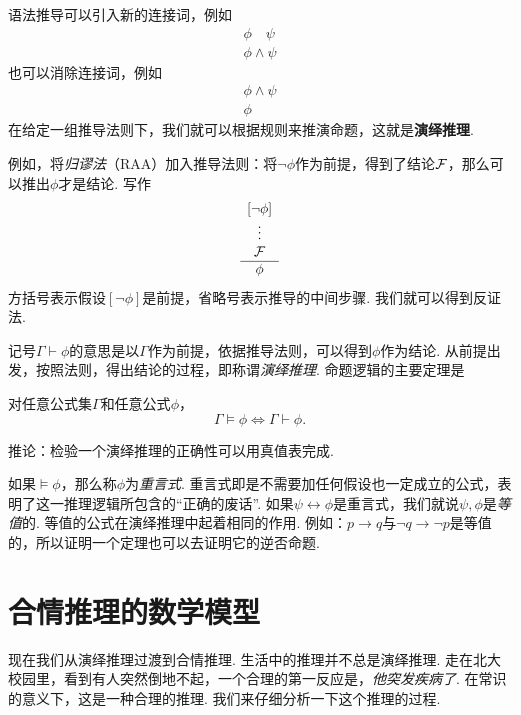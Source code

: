 语法推导可以引入新的连接词，例如
    \[\begin{array}{c}
         \phi\quad\psi  \\\hline
         \phi\wedge\psi
    \end{array}\]
也可以消除连接词，例如
    \[\begin{array}{c}
         \phi\wedge\psi  \\\hline
         \phi
    \end{array}\]
在给定一组推导法则下，我们就可以根据规则来推演命题，这就是\textbf{演绎推理}.

例如，将\emph{归谬法}（RAA）加入推导法则：将$\neg\phi$作为前提，得到了结论$\mathcal{F}$，那么可以推出$\phi$才是结论. 写作
    \[\begin{array}{c}
         [\neg\phi]  \\
         \vdots\\
         \mathcal{F}\\\hline
         \phi
    \end{array}\]
方括号表示假设$[\neg\phi]$是前提，省略号表示推导的中间步骤. 我们就可以得到反证法. 

记号$\Gamma\vdash\phi$的意思是以$\Gamma$作为前提，依据推导法则，可以得到$\phi$作为结论. 从前提出发，按照法则，得出结论的过程，即称谓\emph{演绎推理}. 命题逻辑的主要定理是
\begin{theorem}[完备性定理]
对任意公式集$\Gamma$和任意公式$\phi$，
\[\Gamma\models\phi\iff\Gamma\vdash\phi.\]
\end{theorem}
推论：检验一个演绎推理的正确性可以用真值表完成.

如果$\models \phi$，那么称$\phi$为\emph{重言式}. 重言式即是不需要加任何假设也一定成立的公式，表明了这一推理逻辑所包含的``正确的废话''. 如果$\psi\leftrightarrow\phi$是重言式，我们就说$\psi,\phi$是\emph{等值}的. 等值的公式在演绎推理中起着相同的作用. 例如：$p\to q$与$\neg q\to\neg p$是等值的，所以证明一个定理也可以去证明它的逆否命题.


\section{合情推理的数学模型}

现在我们从演绎推理过渡到合情推理. 生活中的推理并不总是演绎推理. 走在北大校园里，看到有人突然倒地不起，一个合理的第一反应是，\emph{他突发疾病了}. 在常识的意义下，这是一种合理的推理. 我们来仔细分析一下这个推理的过程.

